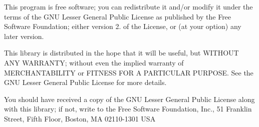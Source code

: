 This program is free software; you can redistribute it and/or modify it under the terms of the G\+N\+U Lesser General Public License as published by the Free Software Foundation; either version 2. of the License, or (at your option) any later version.

This library is distributed in the hope that it will be useful, but W\+I\+T\+H\+O\+U\+T A\+N\+Y W\+A\+R\+R\+A\+N\+T\+Y; without even the implied warranty of M\+E\+R\+C\+H\+A\+N\+T\+A\+B\+I\+L\+I\+T\+Y or F\+I\+T\+N\+E\+S\+S F\+O\+R A P\+A\+R\+T\+I\+C\+U\+L\+A\+R P\+U\+R\+P\+O\+S\+E. See the G\+N\+U Lesser General Public License for more details.

You should have received a copy of the G\+N\+U Lesser General Public License along with this library; if not, write to the Free Software Foundation, Inc., 51 Franklin Street, Fifth Floor, Boston, M\+A 02110-\/1301 U\+S\+A 